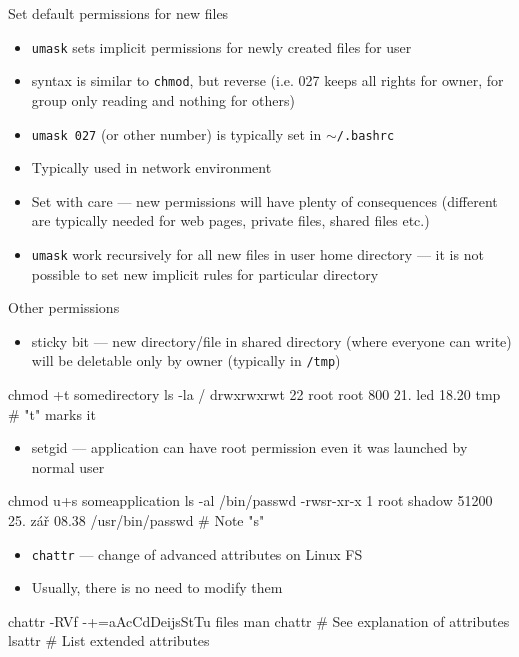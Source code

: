 \documentclass[hyperref={bookmarks=true, unicode=true, colorlinks=true, pdftitle={Linux, command line and MetaCentrum}, plainpages=false, pdfauthor={Vojtech Zeisek}, pdfsubject={Course about use of Linux command line, writing shell scripts and using MetaCentrum of CESNET}, pdfcreator={XeLaTeX, http://www.xelatex.org/}, pdfkeywords={Linux, GNU, BASH, shell, command line, MetaCentrum}, linkcolor=Sienna, anchorcolor=black, citecolor=green, filecolor=magenta, menucolor=Sienna, urlcolor=cyan, pdftex}, compress, ucs, xelatex, xcolor=svgnames, 11pt]{beamer}
\begin{document}
\begin{frame}{Set default permissions for new files}
\begin{itemize}
  \item \texttt{umask} sets implicit permissions for newly created files for user
  \item syntax is similar to \texttt{chmod}, but reverse (i.e. 027 keeps all rights for owner, for group only reading and nothing for others)
  \item \texttt{umask 027} (or other number) is typically set in \texttt{$\sim$/.bashrc}
  \item Typically used in network environment
  \item Set with care --- new permissions will have plenty of consequences (different are typically needed for web pages, private files, shared files etc.)
  \item \texttt{umask} work recursively for all new files in user home directory --- it is not possible to set new implicit rules for particular directory
\end{itemize}
\end{frame}

\begin{frame}[fragile]{Other permissions}
\begin{itemize}
  \item sticky bit --- new directory/file in shared directory (where everyone can write) will be deletable only by owner (typically in \texttt{/tmp})
\end{itemize}
  \begin{bashcode}
    chmod +t somedirectory
    ls -la /
    drwxrwxrwt 22 root root 800 21. led 18.20 tmp # "t" marks it
  \end{bashcode}
\begin{itemize}
  \item setgid --- application can have root permission even it was launched by normal user
\end{itemize}
  \begin{bashcode}
    chmod u+s someapplication
    ls -al /bin/passwd
    -rwsr-xr-x 1 root shadow 51200 25. zář 08.38 /usr/bin/passwd # Note "s"
  \end{bashcode}
\begin{itemize}
  \item \texttt{chattr} --- change of advanced attributes on Linux FS
  \item Usually, there is no need to modify them
\end{itemize}
  \begin{bashcode}
    chattr -RVf -+=aAcCdDeijsStTu files
    man chattr # See explanation of attributes
    lsattr # List extended attributes
  \end{bashcode}
\end{frame}
\end{document}
